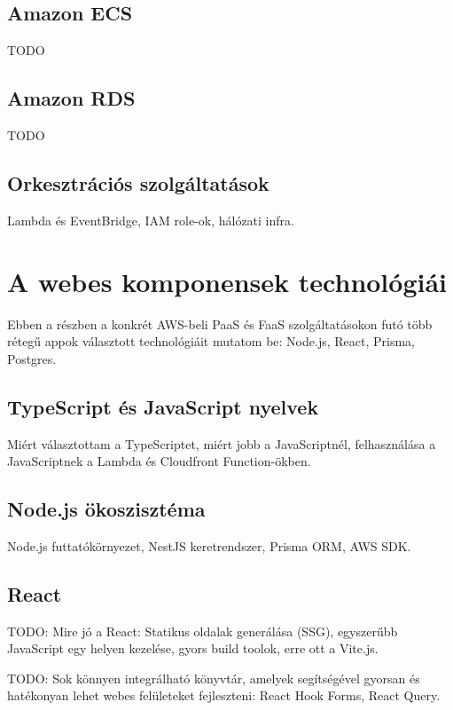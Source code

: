\subsection{Amazon ECS}

TODO

\subsection{Amazon RDS}

TODO

\subsection{Orkesztrációs szolgáltatások}

Lambda és EventBridge, IAM role-ok, hálózati infra.

\section{A webes komponensek technológiái}

Ebben a részben a konkrét AWS-beli PaaS és FaaS szolgáltatásokon futó több rétegű appok választott technológiáit mutatom be: Node.js, React, Prisma, Postgres.

\subsection{TypeScript és JavaScript nyelvek}

Miért választottam a TypeScriptet, miért jobb a JavaScriptnél, felhasználása a JavaScriptnek a Lambda és Cloudfront Function-ökben.

\subsection{Node.js ökoszisztéma}

Node.js futtatókörnyezet, NestJS keretrendszer, Prisma ORM, AWS SDK.

\subsection{React}

TODO: Mire jó a React: Statikus oldalak generálása (SSG), egyszerűbb JavaScript egy helyen kezelése, gyors build toolok, erre ott a Vite.js.

TODO: Sok könnyen integrálható könyvtár, amelyek segítségével gyorsan és hatékonyan lehet webes felületeket fejleszteni: React Hook Forms, React Query.
